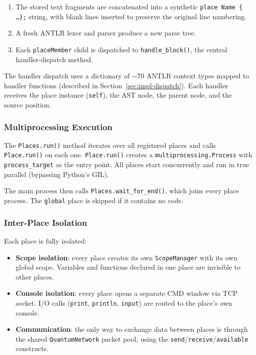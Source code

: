 \begin{enumerate}
    \item The stored text fragments are concatenated into a synthetic
          \texttt{place Name \{ \ldots \};} string, with blank lines
          inserted to preserve the original line numbering.
    \item A fresh ANTLR lexer and parser produce a new parse tree.
    \item Each \texttt{placeMember} child is dispatched to
          \texttt{handle\_block()}, the central handler-dispatch method.
\end{enumerate}

The handler dispatch uses a dictionary of ${\sim}70$ ANTLR context
types mapped to handler functions (described in
Section~\ref{sec:impl-dispatch}). Each handler receives the place
instance (\texttt{self}), the AST node, the parent node, and the source
position.

\subsubsection{Multiprocessing Execution}

The \texttt{Places.run()} method iterates over all registered places and
calls \texttt{Place.run()} on each one.  \texttt{Place.run()} creates a
\texttt{multiprocessing.Process} with \texttt{process\_target} as the
entry point.  All places start concurrently and run in true parallel
(bypassing Python's GIL).

The main process then calls \texttt{Places.wait\_for\_end()}, which
joins every place process.  The \texttt{global} place is skipped if it
contains no code.

\subsubsection{Inter-Place Isolation}

Each place is fully isolated:

\begin{itemize}
    \item \textbf{Scope isolation}: every place creates its own
          \texttt{ScopeManager} with its own global scope.  Variables
          and functions declared in one place are invisible to other
          places.
    \item \textbf{Console isolation}: every place opens a separate CMD
          window via TCP socket.  I/O calls (\texttt{print},
          \texttt{println}, \texttt{input}) are routed to the place's
          own console.
    \item \textbf{Communication}: the only way to exchange data between
          places is through the shared \texttt{QuantumNetwork} packet
          pool, using the \texttt{send}/\texttt{receive}/\texttt{available}
          constructs.
\end{itemize}

